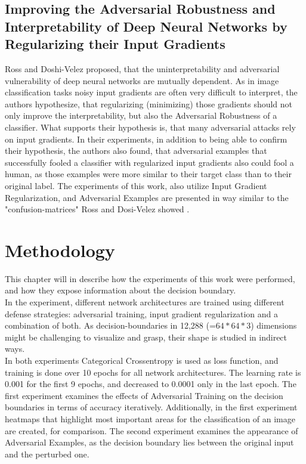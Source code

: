 \documentclass[draft,final]{vutinfth} %
\begin{document}
\section{Improving the Adversarial Robustness and Interpretability of Deep Neural Networks by Regularizing their Input Gradients}
Ross and Doshi-Velez proposed, that the uninterpretability and adversarial vulnerability of deep neural networks are mutually dependent.
As in image classification tasks noisy input gradients are often very difficult to interpret, the authors hypothesize, that regularizing (minimizing) those gradients should not only improve the interpretability, but also the Adversarial Robustness of a classifier.
What supports their hypothesis is, that many adversarial attacks rely on input gradients.
In their experiments, in addition to being able to confirm their hypothesis, the authors also found, that adversarial examples that successfully fooled a classifier with regularized input gradients also could fool a human, as those examples were more similar to their target class than to their original label.
The experiments of this work, also utilize Input Gradient Regularization, and Adversarial Examples are presented in way similar to the "confusion-matrices" Ross and Dosi-Velez showed \cite{Ross2017}.



\chapter{Methodology}

This chapter will in describe how the experiments of this work were performed, and how they expose information about the decision boundary.\\

In the experiment, different network architectures are trained using different defense strategies: adversarial training, input gradient regularization and a combination of both.
As decision-boundaries in 12,288 (=$64*64*3$) dimensions might be challenging to visualize and grasp, their shape is studied in indirect ways.\\
In both experiments Categorical Crossentropy is used as loss function, and training is done over 10 epochs for all network architectures.
The learning rate is 0.001 for the first 9 epochs, and decreased to 0.0001 only in the last epoch.
The first experiment examines the effects of Adversarial Training on the decision boundaries in terms of accuracy iteratively.
Additionally, in the first experiment heatmaps that highlight most important areas for the classification of an image are created, for comparison.
The second experiment examines the appearance of Adversarial Examples, as the decision boundary lies between the original input and the perturbed one.
\end{document}

